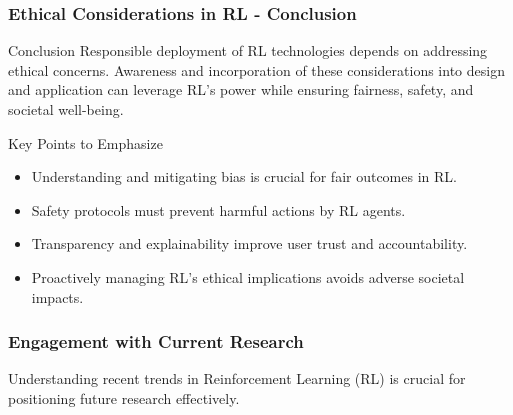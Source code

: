 \documentclass[aspectratio=169]{beamer}
\begin{document}
\begin{frame}[fragile]
    \frametitle{Ethical Considerations in RL - Conclusion}
    \begin{block}{Conclusion}
    Responsible deployment of RL technologies depends on addressing ethical concerns. 
    Awareness and incorporation of these considerations into design and application can leverage RL's power while ensuring fairness, safety, and societal well-being.
    \end{block}

    \begin{block}{Key Points to Emphasize}
        \begin{itemize}
            \item Understanding and mitigating bias is crucial for fair outcomes in RL.
            \item Safety protocols must prevent harmful actions by RL agents.
            \item Transparency and explainability improve user trust and accountability.
            \item Proactively managing RL's ethical implications avoids adverse societal impacts.
        \end{itemize}
    \end{block}
\end{frame}

\begin{frame}[fragile]
    \frametitle{Engagement with Current Research}
    Understanding recent trends in Reinforcement Learning (RL) is crucial for positioning future research effectively.
\end{frame}
\end{document}
